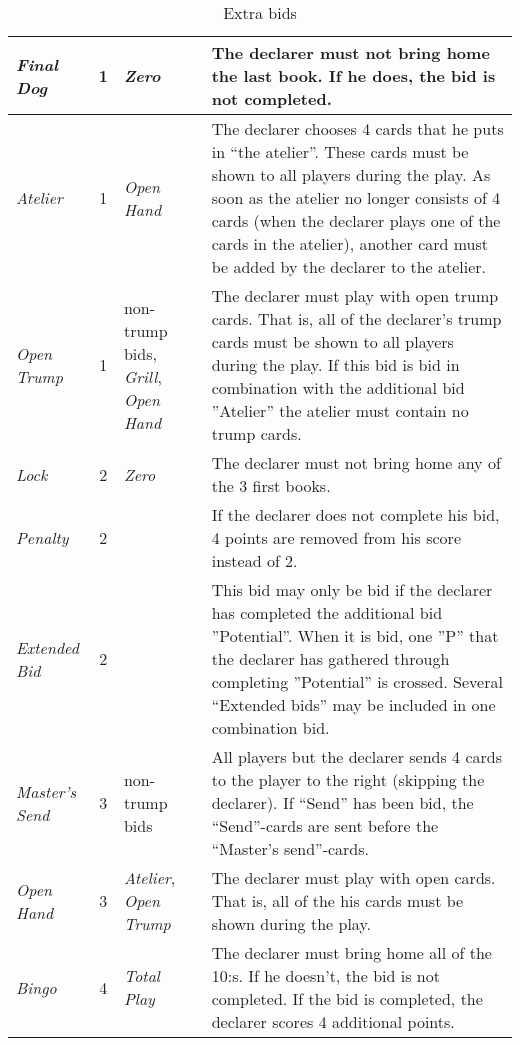 \begin{table}
\begin{center}
{\begin{tabularx}{\textwidth}{ lcX | p{6cm} }
					\textit{Final Dog} & 1 &
					\textit{Zero} &
					The declarer must not bring home the last book. If he does, the bid is not completed.
					\\ \hline
					
					\textit{Atelier} & 1 &
					\textit{Open Hand} &
					The declarer chooses 4 cards that he puts in ``the atelier''. These cards must be shown to all players during the play. As soon as the atelier no longer consists of 4 cards (when the declarer plays one of the cards in the atelier), another card must be added by the declarer to the atelier.
					\\ \hline
					
					\textit{Open Trump} & 1 &
					non-trump bids, \newline \textit{Grill}, \newline \textit{Open Hand} &
					The declarer must play with open trump cards. That is, all of the declarer’s trump cards must be shown to all players during the play. If this bid is bid in combination with the additional bid ”Atelier” the atelier must contain no trump cards.
					\\ \hline
					
					\textit{Lock} & 2 &
					\textit{Zero} &
					The declarer must not bring home any of the 3 first books.
					\\ \hline
					
					\textit{Penalty} & 2 &
					&
					If the declarer does not complete his bid, 4 points are removed from his score instead of 2.
					\\ \hline
					
					\textit{Extended Bid} & 2 &
					&
					This bid may only be bid if the declarer has completed the additional bid ”Potential”. When it is bid, one ”P” that the declarer has gathered through completing ”Potential” is crossed. Several ``Extended bids'' may be included in one combination bid.
					\\ \hline
					
					\textit{Master's Send} & 3 &
					non-trump bids &
					All players but the declarer sends 4 cards to the player to the right (skipping the declarer). If ``Send'' has been bid, the ``Send''-cards are sent before the ``Master's send''-cards.
					\\ \hline
					
					\textit{Open Hand} & 3 &
					
 
					\textit{Atelier}, \newline \textit{Open Trump} &
					The declarer must play with open cards. That is, all of the his cards must be shown during the play.
					\\ \hline
					
					\textit{Bingo} & 4 &
					\textit{Total Play} &
					The declarer must bring home all of the 10:s. If he doesn't, the bid is not completed. If the bid is completed, the declarer scores 4 additional points.
			\end{tabularx}
		}
	\end{center}
	\caption{Extra bids}
	\label{tab:extraBids}
\end{table}
